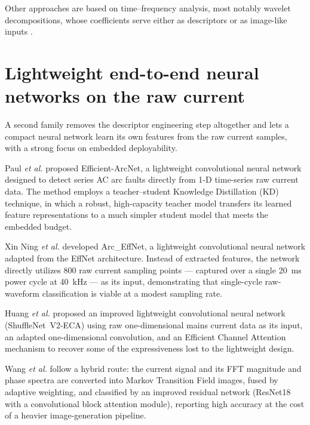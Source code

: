 \medskip

Other approaches are based on time--frequency analysis, most notably wavelet decompositions, whose coefficients serve either as descriptors or as image-like inputs \cite{qu2023multimodal,wang2025mtf}.

\section{Lightweight end-to-end neural networks on the raw current}
\label{sec:sota-endtoend}

A second family removes the descriptor engineering step altogether and lets a compact neural network learn its own features from the raw current samples, with a strong focus on embedded deployability.

\medskip

Paul \emph{et al.} \cite{paul2021efficient} proposed Efficient-ArcNet, a lightweight convolutional neural network designed to detect series AC arc faults directly from 1-D time-series raw current data. The method employs a teacher--student Knowledge Distillation (KD) technique, in which a robust, high-capacity teacher model transfers its learned feature representations to a much simpler student model that meets the embedded budget.

\medskip

Xin Ning \emph{et al.} \cite{ning2023arceffnet} developed Arc\_EffNet, a lightweight convolutional neural network adapted from the EffNet architecture. Instead of extracted features, the network directly utilizes 800 raw current sampling points --- captured over a single 20~ms power cycle at 40~kHz --- as its input, demonstrating that single-cycle raw-waveform classification is viable at a modest sampling rate.

\medskip

Huang \emph{et al.} \cite{huang2025shufflenet} proposed an improved lightweight convolutional neural network (ShuffleNet~V2-ECA) using raw one-dimensional mains current data as its input, an adapted one-dimensional convolution, and an Efficient Channel Attention mechanism to recover some of the expressiveness lost to the lightweight design.

\medskip

Wang \emph{et al.} \cite{wang2025mtf} follow a hybrid route: the current signal and its FFT magnitude and phase spectra are converted into Markov Transition Field images, fused by adaptive weighting, and classified by an improved residual network (ResNet18 with a convolutional block attention module), reporting high accuracy at the cost of a heavier image-generation pipeline.

